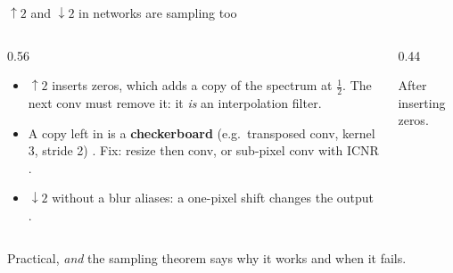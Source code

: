 \documentclass[aspectratio=169]{beamer}
\begin{document}
\begin{frame}{$\uparrow2$ and $\downarrow2$ in networks are sampling too}
  \begin{columns}[T]
    \begin{column}{0.56\textwidth}
      \begin{itemize}
        \item \textbf{$\uparrow2$} inserts zeros, which adds a \textcolor{hot}{copy} of the spectrum at $\tfrac12$. The next conv must remove it: it \emph{is} an interpolation filter.
        \item A copy left in is a \textbf{checkerboard} (e.g.\ transposed conv, kernel 3, stride 2) \cite{odena2016}. Fix: resize then conv, or sub-pixel conv with ICNR \cite{shi2016,aitken2017}.
        \item \textbf{$\downarrow2$} without a blur aliases: a one-pixel shift changes the output \cite{zhang2019,karras2021}.
      \end{itemize}
    \end{column}
    \begin{column}{0.44\textwidth}
      \begin{center}
      \end{center}
      {\small After inserting zeros.}
    \end{column}
  \end{columns}
  \medskip
  Practical, \emph{and} the sampling theorem says why it works and when it fails.
\end{frame}
\end{document}
